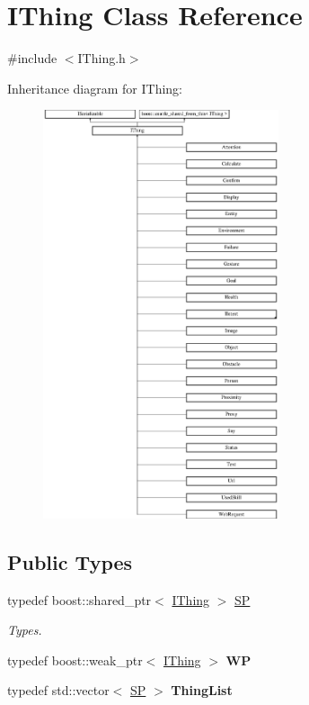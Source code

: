 \hypertarget{class_i_thing}{}\section{I\+Thing Class Reference}
\label{class_i_thing}


{\ttfamily \#include $<$I\+Thing.\+h$>$}

Inheritance diagram for I\+Thing\+:\begin{figure}[H]
\begin{center}
\leavevmode
\includegraphics[height=12.000000cm]{class_i_thing}
\end{center}
\end{figure}
\subsection*{Public Types}
\begin{DoxyCompactItemize}
\item 
\mbox{\label{class_i_thing_a6e95654aef6362c48b9a2fd44a1f970a}} 
typedef boost\+::shared\+\_\+ptr$<$ \hyperlink{class_i_thing}{I\+Thing} $>$ \hyperlink{class_i_thing_a6e95654aef6362c48b9a2fd44a1f970a}{SP}
\begin{DoxyCompactList}\small\item\em Types. \end{DoxyCompactList}\item 
\mbox{\label{class_i_thing_a381facb34aee1e2b39f1b19388799f10}} 
typedef boost\+::weak\+\_\+ptr$<$ \hyperlink{class_i_thing}{I\+Thing} $>$ {\bfseries WP}
\item 
\mbox{\label{class_i_thing_a15b1a956e875bcbdb94b92a66e6b1134}} 
typedef std\+::vector$<$ \hyperlink{class_i_thing_a6e95654aef6362c48b9a2fd44a1f970a}{SP} $>$ {\bfseries Thing\+List}
\end{DoxyCompactItemize}
